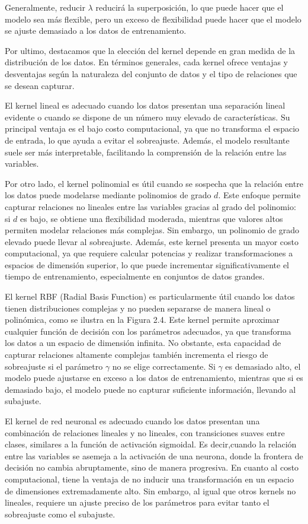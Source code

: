 \documentclass[letterpaper,12pt,oneside]{book}
\begin{document}
{{{{Generalmente, reducir \(\lambda\) reducirá la superposición, lo que puede hacer que el modelo sea más flexible, pero un exceso de flexibilidad puede hacer que el modelo se ajuste demasiado a los datos de entrenamiento.

Por ultimo, destacamos que la elección del kernel depende en gran medida de la distribución de los datos. En términos generales, cada kernel ofrece ventajas y desventajas según la naturaleza del conjunto de datos y el tipo de relaciones que se desean capturar.

El kernel lineal es adecuado cuando los datos presentan una separación lineal evidente o cuando se dispone de un número muy elevado de características. Su principal ventaja es el bajo costo computacional, ya que no transforma el espacio de entrada, lo que ayuda a evitar el sobreajuste. Además, el modelo resultante suele ser más interpretable, facilitando la comprensión de la relación entre las variables.

Por otro lado, el kernel polinomial es útil cuando se sospecha que la relación entre los datos puede modelarse mediante polinomios de grado 
$d$. Este enfoque permite capturar relaciones no lineales entre las variables gracias al grado del polinomio: si 
$d$ es bajo, se obtiene una flexibilidad moderada, mientras que valores altos permiten modelar relaciones más complejas. Sin embargo, un polinomio de grado elevado puede llevar al sobreajuste. Además, este kernel presenta un mayor costo computacional, ya que requiere calcular potencias y realizar transformaciones a espacios de dimensión superior, lo que puede incrementar significativamente el tiempo de entrenamiento, especialmente en conjuntos de datos grandes.

El kernel RBF (Radial Basis Function) es particularmente útil cuando los datos tienen distribuciones complejas y no pueden separarse de manera lineal o polinómica, como se ilustra en la Figura 2.4. Este kernel permite aproximar cualquier función de decisión con los parámetros adecuados, ya que transforma los datos a un espacio de dimensión infinita. No obstante, esta capacidad de capturar relaciones altamente complejas también incrementa el riesgo de sobreajuste si el parámetro 
$\gamma$ no se elige correctamente. Si 
$\gamma$ es demasiado alto, el modelo puede ajustarse en exceso a los datos de entrenamiento, mientras que si es demasiado bajo, el modelo puede no capturar suficiente información, llevando al subajuste.

El kernel de red neuronal es adecuado cuando los datos presentan una combinación de relaciones lineales y no lineales, con transiciones suaves entre clases, similares a la función de activación sigmoidal. Es decir,cuando la relación entre las variables se asemeja a la activación de una neurona, donde la frontera de decisión no cambia abruptamente, sino de manera progresiva. En cuanto al costo computacional, tiene la ventaja de no inducir una transformación en un espacio de dimensiones extremadamente alto. Sin embargo, al igual que otros kernels no lineales, requiere un ajuste preciso de los parámetros para evitar tanto el sobreajuste como el subajuste.

}}}}
\end{document}
